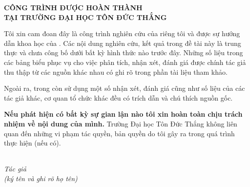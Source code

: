 \clearpage
\begin{center}
{\fontsize{16}{20}\selectfont\bfseries CÔNG TRÌNH ĐƯỢC HOÀN THÀNH\\ TẠI TRƯỜNG ĐẠI HỌC TÔN ĐỨC THẮNG\par}
\end{center}
\vspace{0.6cm}
Tôi xin cam đoan đây là công trình nghiên cứu của riêng tôi và được sự hướng dẫn khoa học của \gvhd. Các nội dung nghiên cứu, kết quả trong đề tài này là trung thực và chưa công bố dưới bất kỳ hình thức nào trước đây. Những số liệu trong các bảng biểu phục vụ cho việc phân tích, nhận xét, đánh giá được chính tác giả thu thập từ các nguồn khác nhau có ghi rõ trong phần tài liệu tham khảo.

Ngoài ra, trong \loaidoanthuong{} còn sử dụng một số nhận xét, đánh giá cũng như số liệu của các tác giả khác, cơ quan tổ chức khác đều có trích dẫn và chú thích nguồn gốc.

\textbf{Nếu phát hiện có bất kỳ sự gian lận nào tôi xin hoàn toàn chịu trách nhiệm về nội dung \loaidoanthuong{} của mình.} Trường Đại học Tôn Đức Thắng không liên quan đến những vi phạm tác quyền, bản quyền do tôi gây ra trong quá trình thực hiện (nếu có).

\vspace{0.8cm}
\hfill\begin{minipage}{0.55\textwidth}\centering
\textit{\ngayky}\\
\textit{Tác giả}\\
\textit{(ký tên và ghi rõ họ tên)}\\[2cm]
\textit{\tensinhvienthuong}
\end{minipage}
